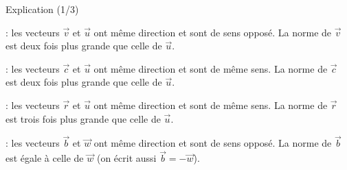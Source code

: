 \documentclass[border=4pt]{standalone}
\begin{document}
\begin{minipage}{16cm}\large \begin{minipage}{15.5cm}{\color{vert}\Large Explication (1/3)}\par{} : les vecteurs $\vec{v}$ et $\vec{u}$ ont même direction et sont de sens opposé. La norme de $\vec{v}$ est deux fois plus grande que celle de $\vec{u}$.\par{} : les vecteurs $\vec{c}$ et $\vec{u}$ ont même direction et sont de même sens. La norme de $\vec{c}$ est deux fois plus grande que celle de $\vec{u}$.\par{} : les vecteurs $\vec{r}$ et $\vec{u}$ ont même direction et sont de même sens. La norme de $\vec{r}$ est trois fois plus grande que celle de $\vec{u}$.\par{} : les vecteurs $\vec{b}$ et $\vec{w}$ ont même direction et sont de sens opposé. La norme de $\vec{b}$ est égale à celle de $\vec{w}$ (on écrit aussi $\vec{b}=-\vec{w}$).\end{minipage}\end{minipage}
\end{document}

